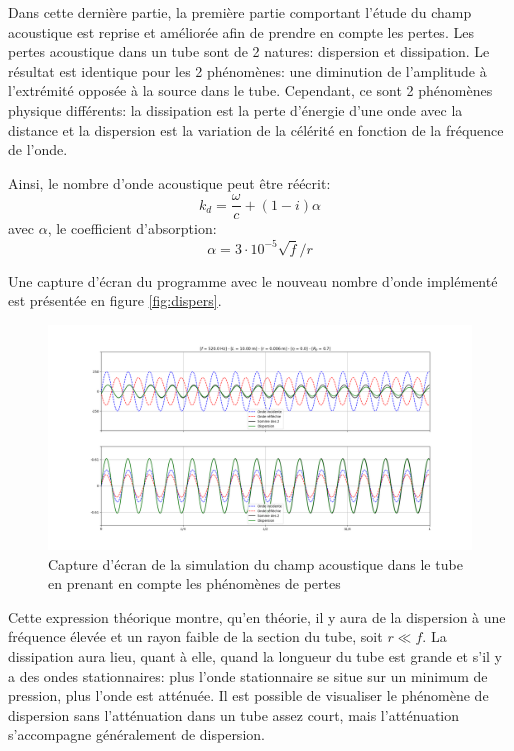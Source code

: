 \documentclass[a4paper,11pt]{article}
\begin{document}
Dans cette dernière partie, la première partie comportant l'étude du champ acoustique est reprise et améliorée afin de prendre en compte les pertes. Les pertes acoustique dans un tube sont de 2 natures: dispersion et dissipation. Le résultat est identique pour les 2 phénomènes: une diminution de l'amplitude à l'extrémité opposée à la source dans le tube. Cependant, ce sont 2 phénomènes physique différents: la dissipation est la perte d'énergie d'une onde avec la distance et la dispersion est la variation de la célérité en fonction de la fréquence de l'onde.

Ainsi, le nombre d'onde acoustique peut être réécrit:
\begin{equation}
	k_d = \frac{\omega}{c} + (1 - i) \alpha
\end{equation}
avec $\alpha$, le coefficient d'absorption:
\begin{equation}
	\alpha = 3 \cdot 10^{-5} \sqrt{f}/r
\end{equation}

Une capture d'écran du programme avec le nouveau nombre d'onde implémenté est présentée en figure \ref{fig:dispers}.

\begin{figure}[H]
	\centering 
	\includegraphics[width=\linewidth]{Figures/tubeKundt_dispers.png}
	\caption{Capture d'écran de la simulation du champ acoustique dans le tube en prenant en compte les phénomènes de pertes}
	\label{fig:simul_acpertes} 
\end{figure}


Cette expression théorique montre, qu'en théorie, il y aura de la dispersion à une fréquence élevée et un rayon faible de la section du tube, soit $r \ll f$. La dissipation aura lieu, quant à elle, quand la longueur du tube est grande et s'il y a des ondes stationnaires: plus l'onde stationnaire se situe sur un minimum de pression, plus l'onde est atténuée. Il est possible de visualiser le phénomène de dispersion sans l'atténuation dans un tube assez court, mais l'atténuation s'accompagne généralement de dispersion.
\end{document}
